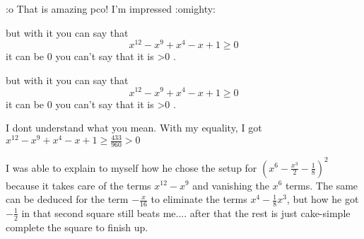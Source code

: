 \begin{solution}
	:o  That is amazing pco! I'm impressed  :omighty:
\end{solution}



\begin{solution}
	but with it  you can say that \[x^12-x^9+x^4-x+1\geq 0\]
it can be 0 you can't say that it is >0 .
\end{solution}



\begin{solution}
	\begin{tcolorbox}but with it  you can say that \[x^12-x^9+x^4-x+1\geq 0\]
it can be 0 you can't say that it is >0 .\end{tcolorbox}
I dont understand what you mean. With my equality, I got $x^{12}-x^9+x^4-x+1\ge \frac{433}{960}>0$
\end{solution}






\begin{solution}
	I was able to explain to myself how he chose the setup for $\left(x^6-\frac{x^3}2-\frac18\right)^2$ because it takes care of the terms $x^{12}-x^9$ and vanishing the $x^6$ terms. The same can be deduced for the term $-\frac{x}{16}$ to eliminate the terms $x^4-\frac18x^3$, but how he got $-\frac12$ in that second square still beats me.... after that the rest is just cake-simple complete the square to finish up.
\end{solution}



